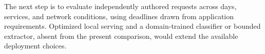 The next step is to evaluate independently authored requests across days,
services, and network conditions, using deadlines drawn from application
requirements. Optimized local serving and a domain-trained classifier or
bounded extractor, absent from the present comparison, would extend the
available deployment choices.
